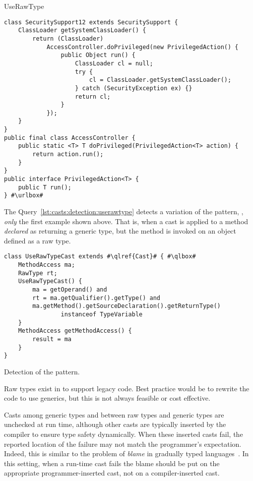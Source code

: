 \begin{pattern}{UseRawType}
\def\urlvar{http://bit.ly/robovm_robovm_2FAI5x5}
\begin{verbatim}
class SecuritySupport12 extends SecuritySupport {
    ClassLoader getSystemClassLoader() {
        return (ClassLoader)
            AccessController.doPrivileged(new PrivilegedAction() {
                public Object run() {
                    ClassLoader cl = null;
                    try {
                        cl = ClassLoader.getSystemClassLoader();
                    } catch (SecurityException ex) {}
                    return cl;
                }
            });
    }
}
public final class AccessController {
    public static <T> T doPrivileged(PrivilegedAction<T> action) {
        return action.run();
    }
}
public interface PrivilegedAction<T> {
    public T run();
} #\urlbox#
\end{verbatim}


\detection{}
The Query~\ref{lst:casts:detection:userawtype} detects a variation of the \thisp{} pattern, \eg{}, \emph{only} the first example shown above.
That is, when a cast is applied to a method \emph{declared} as returning a generic type,
but the method is invoked on an object defined as a raw type.

\begin{listing}
\begin{verbatim}
class UseRawTypeCast extends #\qlref{Cast}# { #\qlbox#
	MethodAccess ma;
	RawType rt;
	UseRawTypeCast() {
		ma = getOperand() and
		rt = ma.getQualifier().getType() and
		ma.getMethod().getSourceDeclaration().getReturnType()
				instanceof TypeVariable
	}
	MethodAccess getMethodAccess() {
		result = ma
	}
}
\end{verbatim}
\caption{Detection of the \thisp{} pattern.}
\label{lst:casts:detection:userawtype}
\end{listing}


\issues{}
Raw types exist in \java{} to support legacy code.
Best practice would be to rewrite the code to use generics,
but this is not always feasible or cost effective.

Casts among generic types and between raw types and generic types are unchecked at run time,
although other casts are typically inserted by the compiler to ensure type safety dynamically.
When these inserted casts fail, the reported location of the failure may not match the programmer's expectation.
Indeed, this is similar to the problem of \emph{blame} in gradually typed languages~\citep{wadlerWellTypedProgramsCan2009}.
In this setting, when a run-time cast fails the blame should be put on the appropriate programmer-inserted cast,
not on a compiler-inserted cast.

\end{pattern}
